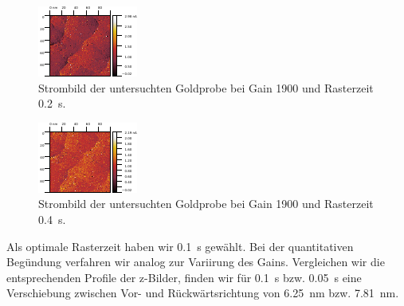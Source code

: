 \begin{figure}[H]
\centering
\includegraphics[width=\textwidth]{../Gwyddion/Gold/TIME_02_I_forward.pdf}
\caption{Strombild der untersuchten Goldprobe bei Gain 1900 und Rasterzeit \SI{0.2}{s}.}
\label{TIME_02_I}
\end{figure}

\begin{figure}[H]
\centering
\includegraphics[width=\textwidth]{../Gwyddion/Gold/TIME_04_I_forward.pdf}
\caption{Strombild der untersuchten Goldprobe bei Gain 1900 und Rasterzeit \SI{0.4}{s}.}
\label{TIME_04_I}
\end{figure}

Als optimale Rasterzeit haben wir \SI{0,1}{s} gewählt. Bei der quantitativen Begündung verfahren wir analog zur Variirung des Gains. Vergleichen wir die entsprechenden Profile der z-Bilder, finden wir für \SI{0,1}{s} bzw. \SI{0,05}{s} eine Verschiebung zwischen Vor- und Rückwärtsrichtung von \SI{6,25}{nm} bzw. \SI{7,81}{nm}.

